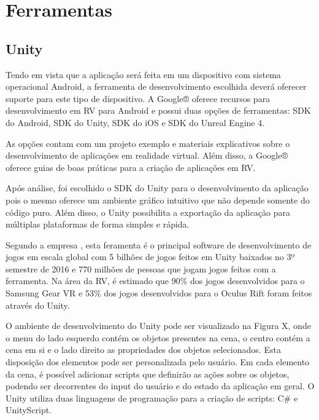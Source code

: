 \chapter{Ferramentas}
\label{c.ferramentas}

\section{Unity}
\label{s.unity}
Tendo em vista que a aplicação será feita em um dispositivo com sistema operacional Android, a ferramenta de desenvolvimento escolhida deverá oferecer suporte para este tipo de dispositivo. A Google® oferece recursos para desenvolvimento em RV para Android e possui duas opções de ferramentas: SDK do Android, SDK do Unity, SDK do iOS e SDK do Unreal Engine 4. \cite{googledocumentacao} 

As opções contam com um projeto exemplo e materiais explicativos sobre o desenvolvimento de aplicações em realidade virtual. Além disso, a Google® oferece guias de boas práticas para a criação de aplicações em RV. 

Após análise, foi escolhido o SDK do Unity para o desenvolvimento da aplicação pois o mesmo oferece um ambiente gráfico intuitivo que não depende somente do código puro. Além disso, o Unity possibilita a exportação da aplicação para múltiplas plataformas de forma simples e rápida.

Segundo a empresa , esta feramenta é o principal software de desenvolvimento de jogos em escala global com 5 bilhões de jogos feitos em Unity baixados no 3º semestre de 2016 e 770 milhões de pessoas que jogam jogos feitos com a ferramenta. Na área da RV, é estimado que 90\% dos jogos desenvolvidos para o Samsung Gear VR e 53\% dos jogos desenvolvidos para o Oculus Rift foram feitos através do Unity.

O ambiente de desenvolvimento do Unity pode ser visualizado na Figura X, onde o menu do lado esquerdo contém os objetos presentes na cena, o centro contém a cena em si e o lado direito as propriedades dos objetos selecionados. Esta disposição dos elementos pode ser personalizada pelo usuário. Em cada elemento da cena, é possível adicionar scripts que definirão as ações sobre os objetos, podendo ser decorrentes do input do usuário e do estado da aplicação em geral. O Unity utiliza duas linguagens de programação para a criação de scripts: C\# e UnityScript.  


